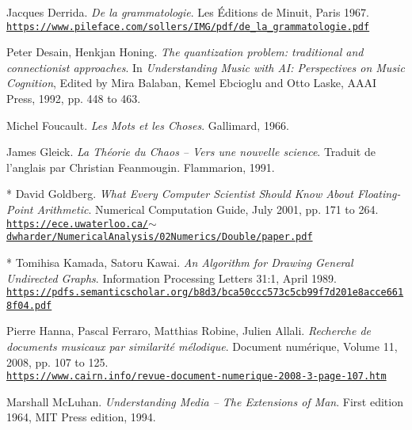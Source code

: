 \begin{thebibliography}{99}
	Jacques Derrida. \textit{De la grammatologie}. Les \'{E}ditions de Minuit, Paris 1967.\\ 
	\href{https://www.pileface.com/sollers/IMG/pdf/de\_la\_grammatologie.pdf}{\scriptsize{\texttt{https://www.pileface.com/sollers/IMG/pdf/de\_la\_grammatologie.pdf}}} \normalsize{}
	
	Peter Desain, Henkjan Honing. \textit{The quantization problem: traditional and connectionist approaches}. In \textit{Understanding Music with AI: Perspectives on Music Cognition}, Edited by Mira Balaban, Kemel Ebcioglu and Otto Laske, AAAI Press, 1992, pp. 448 to 463.
	
	Michel Foucault. \textit{Les Mots et les Choses}. Gallimard, 1966.

	James Gleick. \textit{La Th\'eorie du Chaos -- Vers une nouvelle science}. Traduit de l'anglais par Christian Feanmougin. Flammarion, 1991.
	
	 * David Goldberg. \textit{What Every Computer Scientist Should Know About Floating-Point Arithmetic}. Numerical Computation Guide, July 2001, pp. 171 to 264.\\ \href{https://ece.uwaterloo.ca/\~dwharder/NumericalAnalysis/02Numerics/Double/paper.pdf}{\scriptsize{\texttt{https://ece.uwaterloo.ca/$\sim$dwharder/NumericalAnalysis/02Numerics/Double/paper.pdf}}} \normalsize{}
	 
	 * Tomihisa Kamada, Satoru Kawai. \textit{An Algorithm for Drawing General Undirected Graphs}. Information Processing Letters 31:1, April 1989.\\ \href{https://pdfs.semanticscholar.org/b8d3/bca50ccc573c5cb99f7d201e8acce6618f04.pdf}{\scriptsize{\texttt{https://pdfs.semanticscholar.org/b8d3/bca50ccc573c5cb99f7d201e8acce6618f04.pdf}}} \normalsize{}
	 
	Pierre Hanna, Pascal Ferraro, Matthias Robine, Julien Allali. \textit{Recherche de documents musicaux par similarit\'{e} m\'{e}lodique}. Document num\'{e}rique, Volume 11, 2008, pp. 107 to 125.\\ 
	\href{https://www.cairn.info/revue-document-numerique-2008-3-page-107.htm}{\scriptsize{\texttt{https://www.cairn.info/revue-document-numerique-2008-3-page-107.htm}}} \normalsize{}
	 	 
	Marshall McLuhan. \textit{Understanding Media -- The Extensions of  Man}. First edition 1964, MIT Press edition, 1994.
	

\end{thebibliography}
